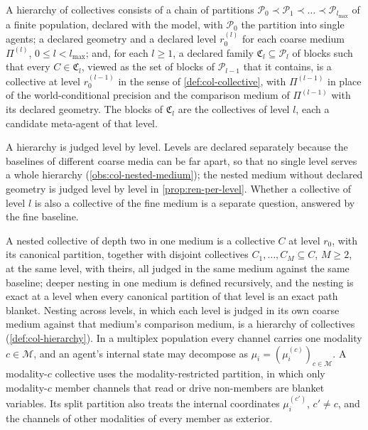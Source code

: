 \begin{definition}\label{def:col-hierarchy}
A hierarchy of collectives consists of a chain of partitions $\mathcal P_0\prec\mathcal P_1\prec\dots\prec\mathcal P_{l_{\max}}$ of a finite population, declared with the model, with $\mathcal P_0$ the partition into single agents; a declared geometry and a declared level $r^{(l)}_0$ for each coarse medium $\Pi^{(l)}$, $0\le l<l_{\max}$; and, for each $l\ge1$, a declared family $\mathfrak C_l\subseteq\mathcal P_l$ of blocks such that every $C\in\mathfrak C_l$, viewed as the set of blocks of $\mathcal P_{l-1}$ that it contains, is a collective at level $r^{(l-1)}_0$ in the sense of \cref{def:col-collective}, with $\Pi^{(l-1)}$ in place of the world-conditional precision and the comparison medium of $\Pi^{(l-1)}$ with its declared geometry. The blocks of $\mathfrak C_l$ are the collectives of level $l$, each a candidate meta-agent of that level.
\end{definition}
A hierarchy is judged level by level. Levels are declared separately because the baselines of different coarse media can be far apart, so that no single level serves a whole hierarchy (\cref{obs:col-nested-medium}); the nested medium without declared geometry is judged level by level in \cref{prop:ren-per-level}. Whether a collective of level $l$ is also a collective of the fine medium is a separate question, answered by the fine baseline.

\begin{definition}\label{def:col-nested}
A nested collective of depth two in one medium is a collective $C$ at level $r_0$, with its canonical partition, together with disjoint collectives $C_1,\dots,C_M\subseteq C$, $M\ge2$, at the same level, with theirs, all judged in the same medium against the same baseline; deeper nesting in one medium is defined recursively, and the nesting is exact at a level when every canonical partition of that level is an exact path blanket. Nesting across levels, in which each level is judged in its own coarse medium against that medium's comparison medium, is a hierarchy of collectives (\cref{def:col-hierarchy}). In a multiplex population every channel carries one modality $c\in\mathcal M$, and an agent's internal state may decompose as $\mu_i=(\mu_i^{(c)})_{c\in\mathcal M}$. A modality-$c$ collective uses the modality-restricted partition, in which only modality-$c$ member channels that read or drive non-members are blanket variables. Its split partition also treats the internal coordinates $\mu_i^{(c')}$, $c'\neq c$, and the channels of other modalities of every member as exterior.
\end{definition}

